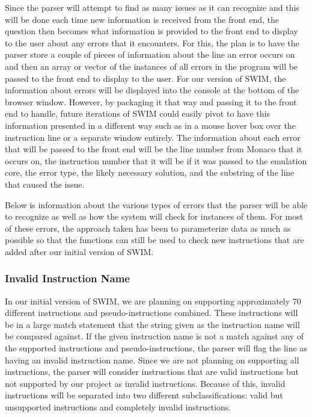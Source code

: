 \documentclass[
    paper=letter,
    parskip=half,
    fontsize=12pt,
    titlepage=firstiscover,
    toc=bibliography,
    numbers=endperiod
]{scrartcl}
\begin{document}
Since the parser will attempt to find as many issues as it can recognize
and this will be done each time new information is received from the
front end, the question then becomes what information is provided to the
front end to display to the user about any errors that it encounters.
For this, the plan is to have the parser store a couple of pieces of
information about the line an error occurs on and then an array or
vector of the instances of all errors in the program will be passed to
the front end to display to the user. For our version of SWIM, the
information about errors will be displayed into the console at the
bottom of the browser window. However, by packaging it that way and
passing it to the front end to handle, future iterations of SWIM could
easily pivot to have this information presented in a different way such
as in a mouse hover box over the instruction line or a separate window
entirely. The information about each error that will be passed to the
front end will be the line number from Monaco that it occurs on, the
instruction number that it will be if it was passed to the emulation
core, the error type, the likely necessary solution, and the substring
of the line that caused the issue.

Below is information about the various types of errors that the parser
will be able to recognize as well as how the system will check for
instances of them. For most of these errors, the approach taken has been
to parameterize data as much as possible so that the functions can still
be used to check new instructions that are added after our initial
version of SWIM.

\subsubsection{Invalid Instruction Name}

In our initial version of SWIM, we are planning on supporting
approximately 70 different instructions and pseudo-instructions
combined. These instructions will be in a large match statement that the
string given as the instruction name will be compared against. If the
given instruction name is not a match against any of the supported
instructions and pseudo-instructions, the parser will flag the line as
having an invalid instruction name. Since we are not planning on
supporting all instructions, the parser will consider instructions that
are valid instructions but not supported by our project as invalid
instructions. Because of this, invalid instructions will be separated
into two different subclassifications: valid but unsupported
instructions and completely invalid instructions.
\end{document}

